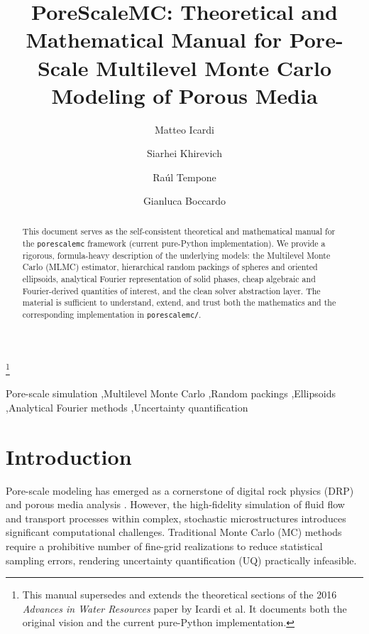 \documentclass[preprint,12pt]{elsarticle}
\begin{document}
\begin{frontmatter}

\title{PoreScaleMC: Theoretical and Mathematical Manual for Pore-Scale Multilevel Monte Carlo Modeling of Porous Media}

\thanks{This manual supersedes and extends the theoretical sections of the 2016 \textit{Advances in Water Resources} paper by Icardi et al. It documents both the original vision and the current pure-Python implementation.}

\author{Matteo Icardi}
\author{Siarhei Khirevich}
\author{Ra\'ul Tempone}
\author{Gianluca Boccardo}

\begin{abstract}
This document serves as the self-consistent theoretical and mathematical manual for the \texttt{porescalemc} framework (current pure-Python implementation). We provide a rigorous, formula-heavy description of the underlying models: the Multilevel Monte Carlo (MLMC) estimator, hierarchical random packings of spheres and oriented ellipsoids, analytical Fourier representation of solid phases, cheap algebraic and Fourier-derived quantities of interest, and the clean solver abstraction layer. The material is sufficient to understand, extend, and trust both the mathematics and the corresponding implementation in \texttt{porescalemc/}.
\end{abstract}

\begin{keyword}
Pore-scale simulation \sep Multilevel Monte Carlo \sep Random packings \sep Ellipsoids \sep Analytical Fourier methods \sep Uncertainty quantification
\end{keyword}

\end{frontmatter}

\section{Introduction}
\label{sec:intro}

Pore-scale modeling has emerged as a cornerstone of digital rock physics (DRP) and porous media analysis \citep{blunt2013pore}. However, the high-fidelity simulation of fluid flow and transport processes within complex, stochastic microstructures introduces significant computational challenges. Traditional Monte Carlo (MC) methods require a prohibitive number of fine-grid realizations to reduce statistical sampling errors, rendering uncertainty quantification (UQ) practically infeasible. 
\end{document}
